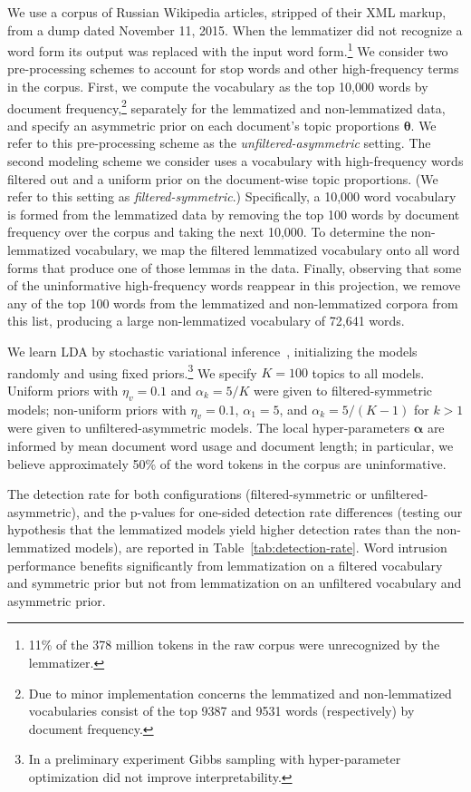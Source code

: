 \documentclass[11pt,letterpaper]{article}
\renewcommand{\vec}{\boldsymbol}   %
\newcommand{\valpha}{{\vec{\alpha}}}
\newcommand{\vtheta}{{\vec{\theta}}}
\begin{document}
{We use a corpus of Russian Wikipedia articles, stripped of their XML
markup, from a dump dated November 11, 2015.
When the lemmatizer did not recognize a word form
its output was replaced with the input word form.\footnote{
    11\% of the 378 million tokens in the raw corpus were
    unrecognized by the lemmatizer.
}
We consider two pre-processing schemes to account for stop words and
other high-frequency terms in the corpus.  First, we compute the
vocabulary as the top 10,000 words by document frequency,\footnote{
    Due to minor implementation concerns the lemmatized and
    non-lemmatized vocabularies consist of the top 9387 and 9531 words
    (respectively) by document frequency.
}
separately for the lemmatized and non-lemmatized data, and
specify an asymmetric prior on each document's topic proportions
$\vtheta$.  We refer to this pre-processing scheme as the
\emph{unfiltered-asymmetric} setting.  The second modeling scheme we
consider uses a vocabulary with high-frequency words filtered out and a
uniform prior on the document-wise topic proportions.
(We refer to this setting as \emph{filtered-symmetric}.)
Specifically, a 10,000 word vocabulary is formed from the
lemmatized data by removing the top 100 words by document frequency
over the corpus and taking the next 10,000.  To determine the
non-lemmatized vocabulary, we map the filtered lemmatized
vocabulary onto all word forms that produce one of those lemmas in
the data.  Finally, observing that some of the uninformative
high-frequency words reappear in this projection, we remove any
of the top 100 words from the lemmatized and non-lemmatized corpora
from this list, producing a large non-lemmatized vocabulary of 72,641
words.

We learn LDA by stochastic variational
inference~\cite{hoffman2013}, initializing the models randomly and
using fixed priors.\footnote{
    In a preliminary experiment Gibbs
    sampling with hyper-parameter optimization did not improve
    interpretability.
}
We specify $K = 100$ topics to all models.
Uniform priors with $\eta_v = 0.1$ and
$\alpha_k = 5 / K$ were given to
filtered-symmetric models; non-uniform priors with
$\eta_v = 0.1$, $\alpha_1 = 5$, and $\alpha_k = 5 / (K-1)$
for $k > 1$
were given to unfiltered-asymmetric models.
The local hyper-parameters $\valpha$ are informed by mean
document word usage and document length; in particular, we
believe approximately 50\% of the word tokens in the corpus are
uninformative.

The detection rate for both configurations (filtered-symmetric or
unfiltered-asymmetric), and the
p-values for one-sided detection rate differences (testing our
hypothesis that the lemmatized models yield higher detection rates than
the non-lemmatized models), are reported in
Table~\ref{tab:detection-rate}.  Word intrusion performance benefits
significantly from lemmatization on a filtered vocabulary and
symmetric prior but not from lemmatization on an
unfiltered vocabulary and asymmetric prior.

}
\end{document}
